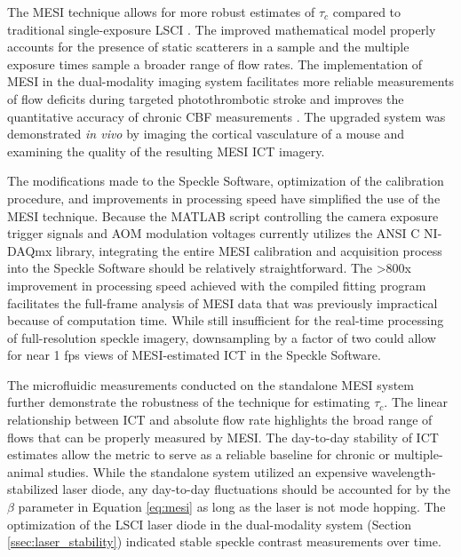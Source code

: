The MESI technique allows for more robust estimates of $\tau_c$ compared to traditional single-exposure LSCI \cite{Parthasarathy:2008el}. The improved mathematical model properly accounts for the presence of static scatterers in a sample and the multiple exposure times sample a broader range of flow rates. The implementation of MESI in the dual-modality imaging system facilitates more reliable measurements of flow deficits during targeted photothrombotic stroke \cite{Parthasarathy:2010vo} and improves the quantitative accuracy of chronic CBF measurements \cite{Kazmi:2013hp}. The upgraded system was demonstrated \textit{in vivo} by imaging the cortical vasculature of a mouse and examining the quality of the resulting MESI ICT imagery.

The modifications made to the Speckle Software, optimization of the calibration procedure, and improvements in processing speed have simplified the use of the MESI technique. Because the MATLAB script controlling the camera exposure trigger signals and AOM modulation voltages currently utilizes the ANSI C NI-DAQmx library, integrating the entire MESI calibration and acquisition process into the Speckle Software should be relatively straightforward. The \textgreater800x improvement in processing speed achieved with the compiled fitting program facilitates the full-frame analysis of MESI data that was previously impractical because of computation time. While still insufficient for the real-time processing of full-resolution speckle imagery, downsampling by a factor of two could allow for near 1 fps views of MESI-estimated ICT in the Speckle Software.

The microfluidic measurements conducted on the standalone MESI system further demonstrate the robustness of the technique for estimating $\tau_c$. The linear relationship between ICT and absolute flow rate highlights the broad range of flows that can be properly measured by MESI. The day-to-day stability of ICT estimates allow the metric to serve as a reliable baseline for chronic or multiple-animal studies. While the standalone system utilized an expensive wavelength-stabilized laser diode, any day-to-day fluctuations should be accounted for by the $\beta$ parameter in Equation \ref{eq:mesi} as long as the laser is not mode hopping. The optimization of the LSCI laser diode in the dual-modality system (Section \ref{ssec:laser_stability}) indicated stable speckle contrast measurements over time.



